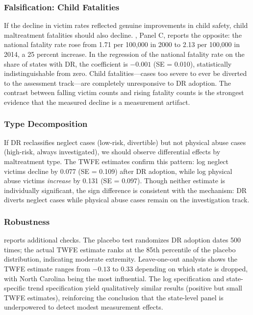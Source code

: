 \documentclass[12pt]{article}
\begin{document}
\subsubsection*{Falsification: Child Fatalities} If the decline in victim rates reflected genuine improvements in child safety, child maltreatment fatalities should also decline. , Panel C, reports the opposite: the national fatality rate rose from 1.71 per 100,000 in 2000 to 2.13 per 100,000 in 2014, a 25 percent increase. In the regression of the national fatality rate on the share of states with DR, the coefficient is $-0.001$ (SE = 0.010), statistically indistinguishable from zero. Child fatalities---cases too severe to ever be diverted to the assessment track---are completely unresponsive to DR adoption. The contrast between falling victim counts and rising fatality counts is the strongest evidence that the measured decline is a measurement artifact.

\subsubsection*{Type Decomposition} If DR reclassifies neglect cases (low-risk, divertible) but not physical abuse cases (high-risk, always investigated), we should observe differential effects by maltreatment type. The TWFE estimates confirm this pattern: log neglect victims decline by 0.077 (SE = 0.109) after DR adoption, while log physical abuse victims \textit{increase} by 0.131 (SE = 0.097). Though neither estimate is individually significant, the sign difference is consistent with the mechanism: DR diverts neglect cases while physical abuse cases remain on the investigation track.

\subsubsection*{Robustness}  reports additional checks. The placebo test randomizes DR adoption dates 500 times; the actual TWFE estimate ranks at the 85th percentile of the placebo distribution, indicating moderate extremity. Leave-one-out analysis shows the TWFE estimate ranges from $-0.13$ to 0.33 depending on which state is dropped, with North Carolina being the most influential. The log specification and state-specific trend specification yield qualitatively similar results (positive but small TWFE estimates), reinforcing the conclusion that the state-level panel is underpowered to detect modest measurement effects.
\end{document}
